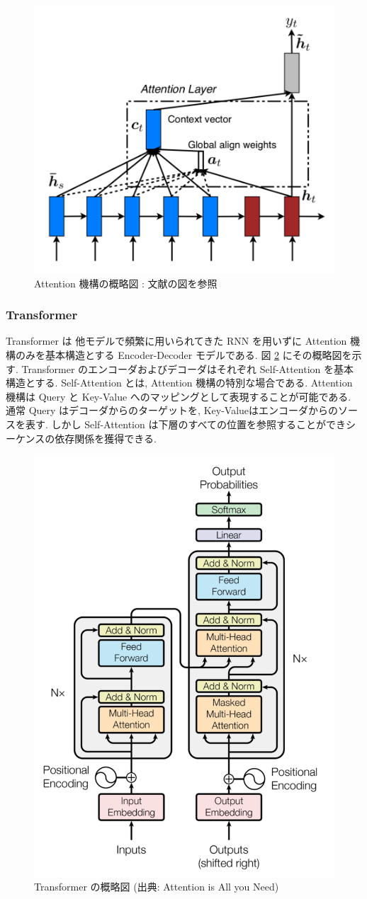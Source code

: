 \begin{figure}[!h]
  \centering
  \includegraphics[width=0.6\hsize]{doc/figures/attention.png}
  \caption{Attention 機構の概略図 : 文献の図を参照}
  \label{fig:attention}
\end{figure}

\newpage
\changeindent{0cm}
\subsubsection{Transformer}
\changeindent{2cm}

Transformer \cite{transformer} は 他モデルで頻繁に用いられてきた RNN を用いずに
Attention 機構のみを基本構造とする Encoder-Decoder モデルである.
図 \ref{fig:transformer} にその概略図を示す.
Transformer のエンコーダおよびデコーダはそれぞれ Self-Attention を基本構造とする. Self-Attention とは, Attention 機構の特別な場合である.
Attention 機構は Query と Key-Value へのマッピングとして表現することが可能である.
通常 Query はデコーダからのターゲットを, Key-Valueはエンコーダからのソースを表す.
しかし Self-Attention は下層のすべての位置を参照することができシーケンスの依存関係を獲得できる.

\begin{figure}[!h]
  \centering
  \includegraphics[width=0.5\hsize]{doc/figures/transformer.png}
  \caption{Transformer の概略図 (出典: Attention is All you Need)}
  \label{fig:transformer}
\end{figure}

